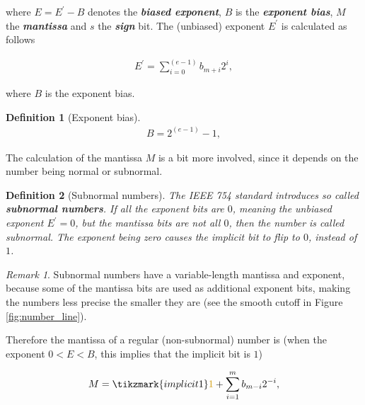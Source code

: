 \documentclass{article}
\theoremstyle{plain} %
\newtheorem{definition}{Definition}[section]
\theoremstyle{convention} %
\theoremstyle{remark} %
\newtheorem*{remark}{Remark} %
\def\df#1{\textbf{\textit{#1}}}
\numberwithin{equation}{section}
\begin{document}
where $E=E^{\prime}-B$ denotes the \df{biased exponent}, $B$ is the \df{exponent bias}, $M$ the \df{mantissa} and $s$ the \df{sign} bit. The (unbiased) exponent $E^{\prime}$ is calculated as follows

\begin{align}
    E^{\prime} = \sum_{i=0}^{(e-1)} b_{m+i} 2^i, \label{eq:exponent}
\end{align}

where $B$ is the exponent bias.

\begin{definition}[Exponent bias]

\begin{align*}
    B = 2^{(e-1)} -1,
\end{align*}

\end{definition}

The calculation of the mantissa $M$ is a bit more involved, since it depends on the number being normal or subnormal.

\begin{definition}[Subnormal numbers]

The IEEE 754 standard introduces so called \df{subnormal numbers}. If all the exponent bits are $0$, meaning the unbiased exponent $E^{\prime}=0$, but the mantissa bits are not all $0$, then the number is called subnormal. The exponent being zero causes the implicit bit to flip to $0$, instead of $1$.

\end{definition}

\begin{remark}
    Subnormal numbers have a variable-length mantissa and exponent, because some of the mantissa bits are used as additional exponent bits, making the numbers less precise the smaller they are (see the smooth cutoff in Figure \ref{fig:number_line}).
\end{remark}

Therefore the mantissa of a regular (non-subnormal) number is (when the exponent $0<E<B$, this implies that the implicit bit is $1$)

\begin{align*}
    M = \tikzmark{implicit1}\textcolor{cyellow}{1} + \sum_{i=1}^{m} b_{m-i} 2^{-i},
\end{align*}

\end{document}
